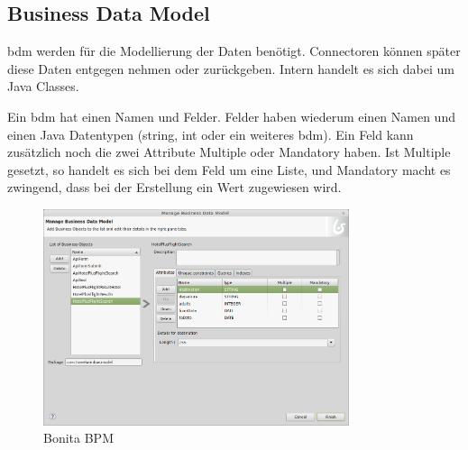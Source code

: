 \subsection{Business Data Model}
\gls{bdm} werden für die Modellierung der Daten benötigt. Connectoren können später diese Daten entgegen nehmen oder zurückgeben. Intern handelt es sich dabei um Java Classes.

Ein \gls{bdm} hat einen Namen und Felder. Felder haben wiederum einen Namen und einen Java Datentypen (string, int oder ein weiteres \gls{bdm}). Ein Feld kann zusätzlich noch die zwei Attribute Multiple oder Mandatory haben. Ist Multiple gesetzt, so handelt es sich bei dem Feld um eine Liste, und Mandatory macht es zwingend, dass bei der Erstellung ein Wert zugewiesen wird.

\begin{figure}[H]
	\centering
	\includegraphics[width=0.8\textwidth]{images/bonita-bpm.png}
	\caption{Bonita BPM}
	\label{fig:analyse:bonita:bpm}
\end{figure}


